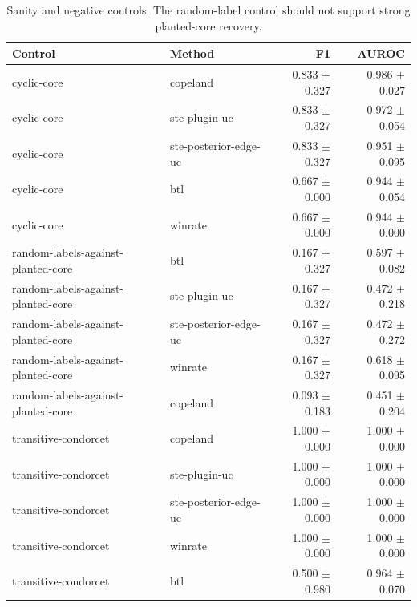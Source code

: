 \begin{table}[t]
\centering
\caption{Sanity and negative controls. The random-label control should not support strong planted-core recovery.}
\begin{tabular}{llrr}
\toprule
Control & Method & F1 & AUROC \\ 
\midrule
cyclic-core & copeland & 0.833 $\pm$ 0.327 & 0.986 $\pm$ 0.027 \\ 
cyclic-core & ste-plugin-uc & 0.833 $\pm$ 0.327 & 0.972 $\pm$ 0.054 \\ 
cyclic-core & ste-posterior-edge-uc & 0.833 $\pm$ 0.327 & 0.951 $\pm$ 0.095 \\ 
cyclic-core & btl & 0.667 $\pm$ 0.000 & 0.944 $\pm$ 0.054 \\ 
cyclic-core & winrate & 0.667 $\pm$ 0.000 & 0.944 $\pm$ 0.000 \\ 
random-labels-against-planted-core & btl & 0.167 $\pm$ 0.327 & 0.597 $\pm$ 0.082 \\ 
random-labels-against-planted-core & ste-plugin-uc & 0.167 $\pm$ 0.327 & 0.472 $\pm$ 0.218 \\ 
random-labels-against-planted-core & ste-posterior-edge-uc & 0.167 $\pm$ 0.327 & 0.472 $\pm$ 0.272 \\ 
random-labels-against-planted-core & winrate & 0.167 $\pm$ 0.327 & 0.618 $\pm$ 0.095 \\ 
random-labels-against-planted-core & copeland & 0.093 $\pm$ 0.183 & 0.451 $\pm$ 0.204 \\ 
transitive-condorcet & copeland & 1.000 $\pm$ 0.000 & 1.000 $\pm$ 0.000 \\ 
transitive-condorcet & ste-plugin-uc & 1.000 $\pm$ 0.000 & 1.000 $\pm$ 0.000 \\ 
transitive-condorcet & ste-posterior-edge-uc & 1.000 $\pm$ 0.000 & 1.000 $\pm$ 0.000 \\ 
transitive-condorcet & winrate & 1.000 $\pm$ 0.000 & 1.000 $\pm$ 0.000 \\ 
transitive-condorcet & btl & 0.500 $\pm$ 0.980 & 0.964 $\pm$ 0.070 \\ 
\bottomrule
\end{tabular}
\end{table}

